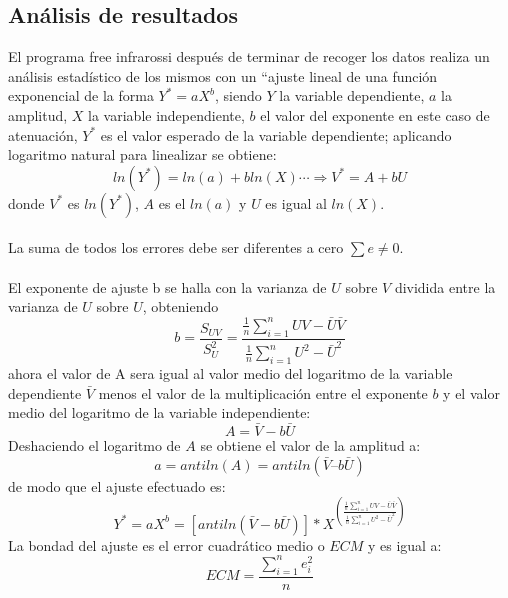 \documentclass[12]{article}
\begin{document}
\begin{multicols}{2}
\section{Análisis de resultados}
El programa free infrarossi después de terminar de recoger los datos realiza un análisis estadístico de los mismos con un “ajuste lineal de una función exponencial de la forma $Y^{*} = aX^{b}$, siendo $Y$ la variable dependiente, $a$ la amplitud, $X$ la variable independiente,  $b$ el valor del exponente en este caso de atenuación, $Y^{*}$ es el valor esperado de la variable dependiente; aplicando logaritmo natural para linealizar se obtiene:
\begin{equation}
ln ( Y^{*}) = ln (a) + bln(X)  \cdots \Longrightarrow V^{*} = A + bU
\end{equation} 
donde $V^{*}$ es $ln(Y^{*})$, $A $ es el $ln(a)$ y $U$ es igual al $ln(X)$. \\\\
La suma de  todos los errores debe ser diferentes a cero $\sum e \neq 0$. \\\\
El exponente de ajuste b se halla con la varianza de $U$ sobre $V$  dividida entre la varianza de $U$ sobre $U$, obteniendo
\begin{equation}
b = \frac{S_{UV}}{S^{2} _{U}} =  \frac{\frac{1}{n} \sum_{i=1}^{n} UV - \bar{U} \bar{V}}{\frac{1}{n} \sum _{i=1}^{n} U^{2} - \bar{U}^2}
\end{equation}
ahora el valor de A sera igual al valor medio del logaritmo de la variable dependiente $\bar{V}$ menos el valor de la multiplicación entre el exponente $b$ y el valor medio del logaritmo de la variable independiente:
\begin{equation}
A = \bar{V} -b\bar{U}
\end{equation}
Deshaciendo el logaritmo de $A$  se obtiene el valor de la amplitud a:
\begin{equation}
a = antiln(A) = antiln(\bar{V} – b\bar{U})
\end{equation}
de modo que el ajuste efectuado es:
\begin{equation}
Y^{*} =  aX^{b}  = [antiln(\bar{V} - b\bar{U})]*X^{ \left(\frac{\frac{1}{n} \sum_{i=1}^{n} UV - \bar{U} \bar{V}}{\frac{1}{n} \sum _{i=1}^{n} U^{2} - \bar{U}^{2}}\right)}
\end{equation}
La bondad del ajuste es el error cuadrático medio o $ECM$ y es igual a: 
\begin{equation}
ECM = \frac{\sum_{i=1}^{n}e_{i}^{2}}{n}
\end{equation}

\end{multicols}
\end{document}
